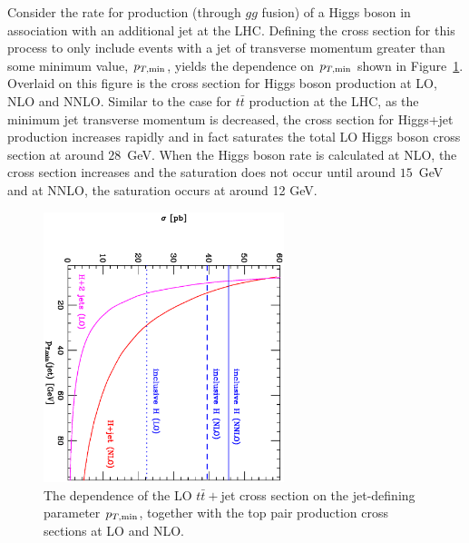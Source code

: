\documentclass[12pt]{iopart}
\begin{document}
Consider the rate for production (through $gg$ fusion) of a Higgs boson in association with an additional jet at the LHC. Defining the cross section for this process to
only include events with a jet of transverse momentum greater than some minimum value, $p_{T, {\rm min}}$, yields
the dependence on $p_{T, {\rm min}}$ shown in Figure~\ref{fig:higgs_jet}. Overlaid on this figure is the cross section for Higgs boson production at LO, NLO and NNLO. Similar to the case for $t\bar{t}$ production at the LHC, as the minimum jet transverse momentum is decreased,
the cross section for Higgs+jet production increases rapidly and in fact saturates the total LO Higgs boson
cross section at around $28$~GeV. When the
Higgs boson rate is calculated at NLO, the cross section increases and the saturation does not occur until around $15$~GeV and at NNLO, the saturation occurs at around 12 GeV. 

%
\begin{figure}[t]
\begin{center}    
\includegraphics[width=7cm,angle=90]{hrate_5.ps}    
\end{center}    
\caption{The dependence of the LO $t{\bar t}+$jet cross section on the jet-defining parameter $p_{T, {\rm min}}$,
together with the top pair production cross sections at LO and NLO.}
\label{fig:higgs_jet}
\end{figure}
%
\end{document}
